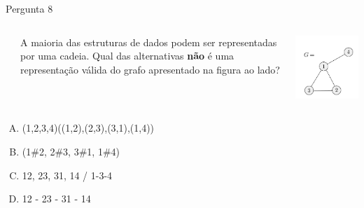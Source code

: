 \documentclass[xcolor=dvipsnames,table]{beamer}
\begin{document}
	\begin{frame}
		\begin{block}{Pergunta 8}
			
			\begin{columns}
				\begin{column}{0.05\textwidth}\end{column}
				\begin{column}{0.45\textwidth}
					A maioria das estruturas de dados podem ser representadas por uma cadeia. Qual das alternativas {\bf não} é uma representação válida do grafo apresentado na figura ao lado?
				\end{column}
				\begin{column}{0.5\textwidth}  %
					\begin{center}
						\includegraphics[width=.6\textwidth]{images/grafo}
					\end{center}
				\end{column}
			\end{columns}
			\begin{center}
				
			\end{center}
		\end{block}
		\begin{enumerate}[(A)]
			\item (1,2,3,4)((1,2),(2,3),(3,1),(1,4)) 
			\item (1\#2, 2\#3, 3\#1, 1\#4)
			\item 12, 23, 31, 14 / 1-3-4
			\item 12 - 23 - 31 - 14
		\end{enumerate}
	\end{frame}
\end{document}
